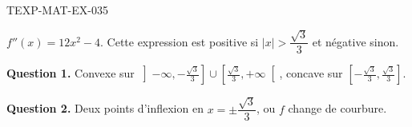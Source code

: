 \begin{corrige}{TEXP-MAT-EX-035}

$f''(x) = 12x^2 - 4$. Cette expression est positive si $|x| > \dfrac{\sqrt{3}}{3}$ et négative sinon.


\textbf{Question 1.} Convexe sur $\left]-\infty, -\frac{\sqrt3}{3}\right] \cup \left[\frac{\sqrt3}{3}, +\infty\right[$, concave sur $\left[-\frac{\sqrt3}{3}, \frac{\sqrt3}{3}\right]$.

\textbf{Question 2.} Deux points d'inflexion en $x = \pm\dfrac{\sqrt{3}}{3}$, ou $f$ change de courbure.

\end{corrige}
